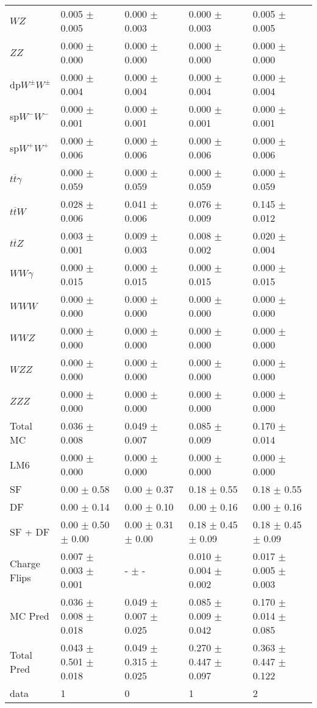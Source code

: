 \begin{tabular}{l | l l l l}
$WZ$ &  0.005 $\pm$  0.005 &  0.000 $\pm$  0.003 &  0.000 $\pm$  0.003 &  0.005 $\pm$  0.005\\
$ZZ$ &  0.000 $\pm$   0.000 &  0.000 $\pm$   0.000 &   0.000 $\pm$   0.000 &   0.000 $\pm$   0.000\\
\hline
dp$W^{\pm}W^{\pm}$ &  0.000 $\pm$  0.004 &  0.000 $\pm$  0.004 &  0.000 $\pm$  0.004 &  0.000 $\pm$  0.004\\
sp$W^{-}W^{-}$ &  0.000 $\pm$  0.001 &  0.000 $\pm$  0.001 &  0.000 $\pm$  0.001 &  0.000 $\pm$  0.001\\
sp$W^{+}W^{+}$ &  0.000 $\pm$  0.006 &  0.000 $\pm$  0.006 &  0.000 $\pm$  0.006 &  0.000 $\pm$  0.006\\
$t\overline{t}\gamma$ &  0.000 $\pm$  0.059 &  0.000 $\pm$  0.059 &  0.000 $\pm$  0.059 &  0.000 $\pm$  0.059\\
$t\overline{t}W$ &  0.028 $\pm$  0.006 &  0.041 $\pm$  0.006 &  0.076 $\pm$  0.009 &  0.145 $\pm$  0.012\\
$t\overline{t}Z$ &  0.003 $\pm$  0.001 &  0.009 $\pm$  0.003 &  0.008 $\pm$  0.002 &  0.020 $\pm$  0.004\\
$WW\gamma$ &  0.000 $\pm$  0.015 &  0.000 $\pm$  0.015 &  0.000 $\pm$  0.015 &  0.000 $\pm$  0.015\\
$WWW$ &   0.000 $\pm$   0.000 &  0.000 $\pm$   0.000 &   0.000 $\pm$   0.000 &   0.000 $\pm$   0.000\\
$WWZ$ &  0.000 $\pm$   0.000 &  0.000 $\pm$   0.000 &  0.000 $\pm$   0.000 &  0.000 $\pm$   0.000\\
$WZZ$ &  0.000 $\pm$   0.000 &  0.000 $\pm$   0.000 &  0.000 $\pm$   0.000 &  0.000 $\pm$   0.000\\
$ZZZ$ &  0.000 $\pm$   0.000 &  0.000 $\pm$   0.000 &   0.000 $\pm$   0.000 &   0.000 $\pm$   0.000\\
\hline
Total MC &  0.036 $\pm$  0.008 &  0.049 $\pm$  0.007 &  0.085 $\pm$  0.009 &  0.170 $\pm$  0.014\\
\hline\hline
\hline
LM6 &  0.000 $\pm$  0.000 &  0.000 $\pm$  0.000 &  0.000 $\pm$  0.000 &  0.000 $\pm$  0.000\\
\hline\hline
\hline\hline
 SF  & 0.00 $\pm$ 0.58 & 0.00 $\pm$ 0.37 & 0.18 $\pm$ 0.55 & 0.18 $\pm$ 0.55\\
 DF  & 0.00 $\pm$ 0.14 & 0.00 $\pm$ 0.10 & 0.00 $\pm$ 0.16 & 0.00 $\pm$ 0.16\\
\hline
 SF + DF  & 0.00 $\pm$ 0.50 $\pm$ 0.00 & 0.00 $\pm$ 0.31 $\pm$ 0.00 & 0.18 $\pm$ 0.45 $\pm$ 0.09 & 0.18 $\pm$ 0.45 $\pm$ 0.09\\
\hline\hline
Charge Flips & 0.007 $\pm$ 0.003 $\pm$ 0.001 & - $\pm$ - & 0.010 $\pm$ 0.004 $\pm$ 0.002 & 0.017 $\pm$ 0.005 $\pm$ 0.003\\
\hline\hline
\hline
MC Pred &  0.036 $\pm$  0.008 $\pm$  0.018 &  0.049 $\pm$  0.007 $\pm$  0.025 &  0.085 $\pm$  0.009 $\pm$  0.042 &  0.170 $\pm$  0.014 $\pm$  0.085\\
\hline\hline
Total Pred &  0.043 $\pm$  0.501 $\pm$  0.018 &  0.049 $\pm$  0.315 $\pm$  0.025 &  0.270 $\pm$  0.447 $\pm$  0.097 &  0.363 $\pm$  0.447 $\pm$  0.122\\
\hline\hline
data & 1 & 0 & 1 & 2\\
\hline\hline
\end{tabular}
